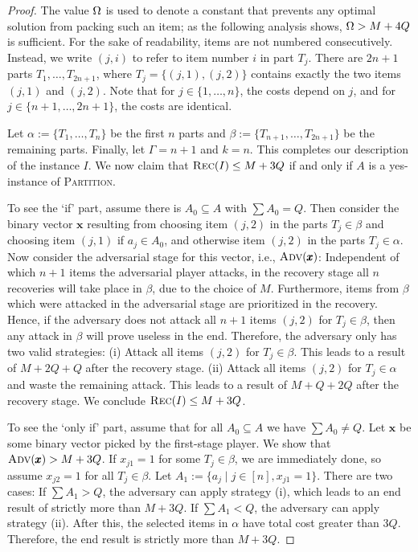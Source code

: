 \begin{proof}
The value $\Omega$ is used to denote a constant that prevents any optimal solution from packing such an item; as the following analysis shows, $\Omega > M+4Q$ is sufficient.
For the sake of readability, items are not numbered consecutively. Instead, we write $(j,i)$ to refer to item number $i$ in part $T_j$.
There are $2n + 1$ parts $T_1, \ldots, T_{2n+1}$, where $T_j = \{(j,1), (j,2)\}$ contains exactly the two items $(j,1)$ and $(j,2)$.  
Note that for $j \in \{1, \ldots, n\}$, the costs depend on $j$, and for $j \in \{n+1, \dots, 2n+1\}$, the costs are identical.

Let $\alpha := \{T_1, \ldots, T_{n}\}$ be the first $n$ parts and $\beta := \{T_{n+1}, \ldots, T_{2n+1}\}$ be the remaining parts. Finally, let $\Gamma = n+1$ and $k = n$. This completes our description of the instance $I$. We now claim that $\textsc{Rec}(I) \leq M + 3Q$ if and only if $A$ is a yes-instance of \textsc{Partition}.

To see the `if' part, assume there is $A_0 \subseteq A$ with $\sum A_0 = Q$. Then consider the binary vector $\pmb x$ resulting from choosing item $(j,2)$ in the parts $T_j \in \beta$ and choosing item $(j,1)$ if $a_j \in A_0$, and otherwise item $(j, 2)$ in the parts $T_j \in \alpha$. Now consider the adversarial stage for this vector, i.e., $\textsc{Adv}(\pmb x)$: Independent of which $n+1$ items the adversarial player attacks, in the recovery stage all $n$ recoveries will take place in $\beta$, due to the choice of $M$. Furthermore, items from $\beta$ which were attacked in the adversarial stage are prioritized in the recovery. Hence, if the adversary does not attack all $n+1$ items $(j,2)$ for $T_j \in \beta$, then any attack in $\beta$ will prove useless in the end. Therefore, the adversary only has two valid strategies:  (i) Attack all items $(j,2)$ for $T_j \in \beta$. This leads to a result of $M + 2Q + Q$ after the recovery stage. (ii) Attack all items $(j,2)$ for $T_j \in \alpha$ and waste the remaining attack. This leads to a result of $M + Q + 2Q$ after the recovery stage. We conclude $\textsc{Rec}(I) \leq M + 3Q$.

To see the `only if' part, assume that for all $A_0 \subseteq A$ we have $\sum A_0 \neq Q$. Let $\pmb x$ be some binary vector picked by the first-stage player. We show that $\textsc{Adv}(\pmb x) > M + 3Q$. If $x_{j1} = 1$ for some $T_j \in \beta$, we are immediately done, so assume $x_{j2} = 1$ for all $T_j \in \beta$. Let $A_1 := \{a_j \mid j \in [n], x_{j1} = 1\}$. There are two cases: If $\sum A_1 > Q$, the adversary can apply strategy (i), which  leads to an end result of strictly more than $M + 3Q$. If $\sum A_1 < Q$, the adversary can apply strategy (ii). After this, the selected items in $\alpha$ have total cost greater than $3Q$. Therefore, the end result is strictly more than $M + 3Q$.

\end{proof}

